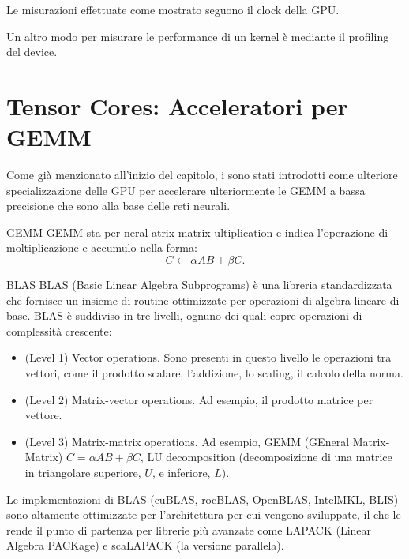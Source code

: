 Le misurazioni effettuate come mostrato seguono il clock della GPU.

\begin{note}{}
Un altro modo per misurare le performance di un kernel è mediante il profiling del device.
\end{note}

\section{Tensor Cores: Acceleratori per GEMM}
Come già menzionato all'inizio del capitolo, i  sono stati introdotti come ulteriore specializzazione delle GPU per accelerare ulteriormente le GEMM a bassa precisione che sono alla base delle reti neurali.

\begin{definition}{GEMM}
    GEMM sta per neral atrix-matrix ultiplication e indica l'operazione di moltiplicazione e accumulo nella forma:
    \[ C \leftarrow \alpha A B + \beta C. \]
\end{definition}

\begin{note}{BLAS}
    BLAS (Basic Linear Algebra Subprograms) è una libreria standardizzata che fornisce un insieme di routine ottimizzate per operazioni di algebra lineare di base. 
    BLAS è suddiviso in tre livelli, ognuno dei quali copre operazioni di complessità crescente:
    \begin{itemize}
        \item (Level 1) Vector operations. Sono presenti in questo livello le operazioni tra vettori, come il prodotto scalare, l'addizione, lo scaling, il calcolo della norma.
        \item (Level 2) Matrix-vector operations. Ad esempio, il prodotto matrice per vettore.
        \item (Level 3) Matrix-matrix operations. Ad esempio, GEMM (GEneral Matrix-Matrix) \(C=\alpha AB + \beta C\), LU decomposition (decomposizione di una matrice in triangolare superiore, \(U\), e inferiore, \(L\)).
    \end{itemize}

    Le implementazioni di BLAS (cuBLAS, rocBLAS, OpenBLAS, IntelMKL, BLIS) sono altamente ottimizzate per l'architettura per cui vengono sviluppate, il che le rende il punto di partenza per librerie più avanzate come LAPACK (Linear Algebra PACKage) e scaLAPACK (la versione parallela).
\end{note}

